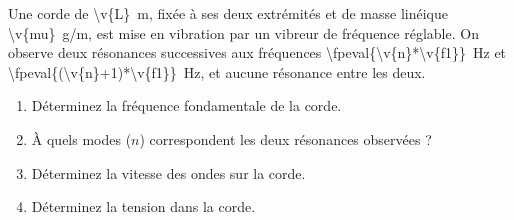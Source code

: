 Une corde de \qty{\v{L}}{m}, fixée à ses deux extrémités et de masse linéique \qty{\v{mu}}{g/m}, est mise en vibration par un vibreur de fréquence réglable. On observe deux résonances successives aux fréquences \qty{\fpeval{\v{n}*\v{f1}}}{Hz} et \qty{\fpeval{(\v{n}+1)*\v{f1}}}{Hz}, et aucune résonance entre les deux.

\begin{enumerate}[label=\alph*)]
    \item Déterminez la fréquence fondamentale de la corde.
    \item À quels modes ($n$) correspondent les deux résonances observées ?
    \item Déterminez la vitesse des ondes sur la corde.
    \item Déterminez la tension dans la corde.
\end{enumerate}
